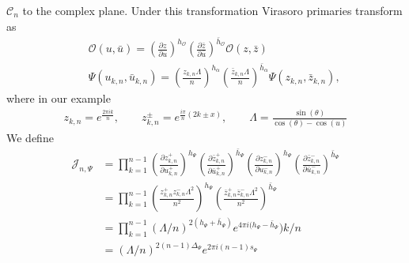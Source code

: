 \documentclass[11pt]{article}
\newcommand{\mO}{\mathcal{O}}
\newcommand{\nn}{\nonumber}
\newcommand{\lb}{\left(}
\newcommand{\rb}{\right)}
\newcommand{\JM}[1]{\textcolor{orange}{#1}}
\begin{document}
  $\mathcal{C}_{n}$ to the complex plane. Under this transformation Virasoro primaries
  transform as
  \begin{eqnarray}
    &&\mO(u,\bar{u})=\lb\frac{\partial z}{\partial u} \rb^{h_\mO}\lb\frac{\partial
    \bar{z}}{\partial\bar{u}}
    \rb^{\bar{h}_\mO}\mO(z,\bar{z})\nn\\
    &&\Psi(u_{k,n},\bar{u}_{k,n})=\lb\frac{z_{k,n}\Lambda}{n}\rb^{h_\alpha}\lb\frac{\bar{z}_{k,n}\Lambda}{n}\rb^{\bar{h}_\alpha}\Psi(z_{k,n},\bar{z}_{k,n}),
  \end{eqnarray}
  where in our example
  \begin{eqnarray}
    z_{k,n} = e^{\frac{2\pi ik}{n}},\qquad z^\pm_{k,n}=e^{\frac{i\pi}{n}(2k\pm x)},\qquad \Lambda=\frac{\sin(\theta)}{\cos(\theta)-\cos(u)}
  \end{eqnarray}
  We define 
  \begin{align}
  \mathcal{J}_{n,\Psi}&=\prod_{k=1}^{n-1}\lb \frac{\partial z^+_{k,n}}{\partial u^+_{k,n}}\rb^{h_\Psi}\lb \frac{\partial \bar{z}^+_{k,n}}{\partial \bar{u}^+_{k,n}}\rb^{\bar{h}_\Psi}\lb \frac{\partial z^-_{k,n}}{\partial u^-_{k,n}}\rb^{h_\Psi}\lb \frac{\partial \bar{z}^-_{k,n}}{\partial \bar{u}^-_{k,n}}\rb^{\bar{h}_\Psi}\nn\\
  &=\prod_{k=1}^{n-1}\lb \frac{z^+_{k,n}z^-_{k,n}\Lambda^2}{n^2}\rb^{h_\Psi}\lb \frac{\bar{z}^+_{k,n}\bar{z}^-_{k,n}\Lambda^2}{n^2}\rb^{\bar{h}_\Psi}\nn\\
  &=\prod_{k=1}^{n-1} (\Lambda/n)^{2(h_\Psi+\bar{h}_\Psi)}e^{4\pi i (h_\Psi-\bar{h}_\Psi})k/n\nn\\
  &=(\Lambda/n)^{2(n-1)\Delta_\Psi}e^{2\pi i(n-1) s_\Psi}
  \end{align}
\end{document}
